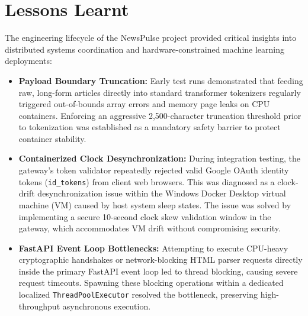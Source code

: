 \section{Lessons Learnt}
The engineering lifecycle of the NewsPulse project provided critical insights into distributed systems coordination and hardware-constrained machine learning deployments:
\begin{itemize}
    \item \textbf{Payload Boundary Truncation:} Early test runs demonstrated that feeding raw, long-form articles directly into standard transformer tokenizers regularly triggered out-of-bounds array errors and memory page leaks on CPU containers. Enforcing an aggressive 2,500-character truncation threshold prior to tokenization was established as a mandatory safety barrier to protect container stability.
    \item \textbf{Containerized Clock Desynchronization:} During integration testing, the gateway's token validator repeatedly rejected valid Google OAuth identity tokens (\texttt{id\_tokens}) from client web browsers. This was diagnosed as a clock-drift desynchronization issue within the Windows Docker Desktop virtual machine (VM) caused by host system sleep states. The issue was solved by implementing a secure 10-second clock skew validation window in the gateway, which accommodates VM drift without compromising security.
    \item \textbf{FastAPI Event Loop Bottlenecks:} Attempting to execute CPU-heavy cryptographic handshakes or network-blocking HTML parser requests directly inside the primary FastAPI event loop led to thread blocking, causing severe request timeouts. Spawning these blocking operations within a dedicated localized \texttt{ThreadPoolExecutor} resolved the bottleneck, preserving high-throughput asynchronous execution.
\end{itemize}

